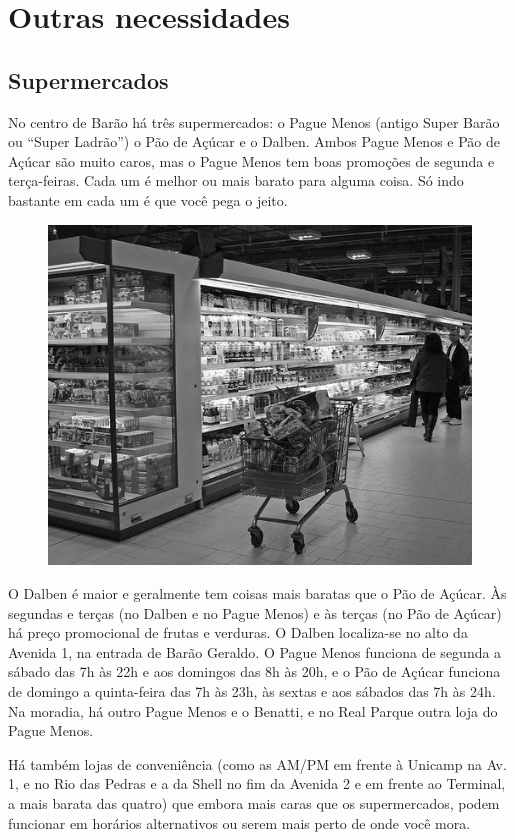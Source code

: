 
\section{Outras necessidades}
\subsection{Supermercados}

No centro de Barão há três supermercados: o Pague Menos (antigo Super Barão ou
``Super Ladrão'') o Pão de Açúcar e o Dalben. Ambos Pague Menos e Pão de Açúcar
são muito caros, mas o Pague Menos tem boas promoções de segunda e terça-feiras.
Cada um é melhor ou mais barato para alguma coisa. Só indo bastante em cada um é
que você pega o jeito.

\begin{figure}[h!]
    \centering
    \includegraphics[width=.45\textwidth]{img/barao/supermercado.jpg}
\end{figure}

O Dalben é maior e geralmente tem coisas mais baratas que o Pão de Açúcar. Às
segundas e terças (no Dalben e no Pague Menos) e às terças (no Pão de Açúcar) há
preço promocional de frutas e verduras. O Dalben localiza-se no alto da Avenida
1, na entrada de Barão Geraldo. O Pague Menos funciona de segunda a sábado das
7h às 22h e aos domingos das 8h às 20h, e o Pão de Açúcar funciona de domingo a
quinta-feira das 7h às 23h, às sextas e aos sábados das 7h às 24h. Na moradia,
há outro Pague Menos e o Benatti, e no Real Parque outra loja do Pague Menos.

Há também lojas de conveniência (como as AM/PM em frente à Unicamp na Av. 1, e
no Rio das Pedras e a da Shell no fim da Avenida 2 e em frente ao Terminal, a
mais barata das quatro) que embora mais caras que os supermercados, podem
funcionar em horários alternativos ou serem mais perto de onde você mora.

